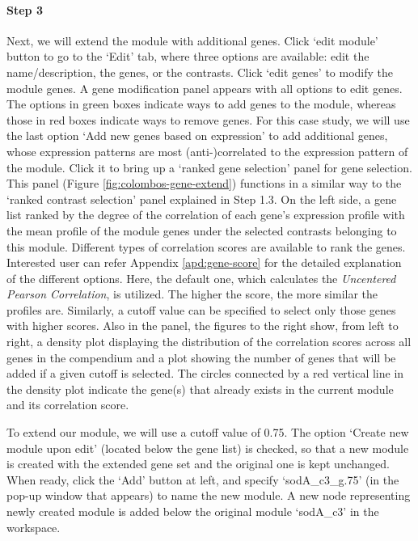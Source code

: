 \begin{small} %


\paragraph{Step 3} Next, we will extend the module with additional genes. Click `edit module' button to go to the `Edit' tab, where three options are available: edit the name/description, the genes, or the contrasts. Click `edit genes' to modify the module genes. A gene modification panel appears with all options to edit genes.  The options in green boxes indicate ways to add genes to the module, whereas those in red boxes indicate ways to remove genes.  For this case study, we will use the last option `Add new genes based on expression' to add additional genes, whose expression patterns are most (anti-)correlated to the expression pattern of the module.  Click it to bring up a `ranked gene selection' panel for gene selection.
\\
This panel (Figure \ref{fig:colombos-gene-extend}) functions in a similar way  to the `ranked contrast selection' panel explained in Step 1.3.  On the left side, a gene list ranked by the degree of the correlation of each gene's expression profile with the mean profile of the module genes under the selected contrasts belonging to this module.   Different types of correlation scores are available to rank the genes. Interested user can refer Appendix \ref{apd:gene-score} for the detailed explanation of the different options.  Here, the default one, which calculates the \textit{Uncentered Pearson Correlation}, is utilized.  The higher the score, the more similar the profiles are.  Similarly, a cutoff value can be specified to select only those genes with higher scores. Also in the panel, the figures to the right show, from left to right, a density plot displaying the distribution of the correlation scores across all genes in the compendium and a plot showing the number of genes that will be added if a given cutoff is selected. The circles connected by a red vertical line in the density plot indicate the gene(s) that already exists in the current module and its correlation score.

To extend our module, we will use a cutoff value of 0.75. The option `Create new module upon edit' (located below the gene list) is checked, so that a new module is created with the extended gene set and the original one is kept unchanged. When ready, click the `Add' button at left, and specify `sodA\_c3\_g.75' (in the pop-up window that appears) to name the new module.  A new node representing newly created module is added below the original module `sodA\_c3' in the workspace.

\end{small} %

